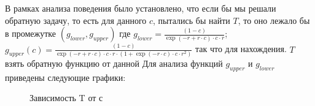 \documentclass[times,specification,annotation]{itmo-student-thesis}
\begin{document}
    В рамках анализа поведения было установлено, что если бы мы решали обратную задачу, то есть для данного $c$, пытались бы найти $T$, то оно лежало бы в промежутке $(g_{lower}, g_{upper})$  где $g_{lower}= \frac{(1 - c)}{\exp(-r + r\cdot c) \cdot c \cdot r}$; $g_{upper}(c) = \frac{(1 - c)}{\exp(-r + r\cdot c) \cdot c \cdot r \cdot (1 + \exp(-r\cdot c) \cdot c \cdot r^2)}$ так что для нахождения. $T$ взять обратную функцию от данной
    Для анализа функций $g_{upper}$ и $g_{lower}$ приведены следующие графики:

    \begin{figure}[h]
        \begin{minipage}[h]{0.49\linewidth}
        \end{minipage}
        \hfill
        \begin{minipage}[h]{0.49\linewidth}
        \end{minipage}
        \caption{Зависимость T от с}
        \label{ris:image1}
    \end{figure}
\end{document}

